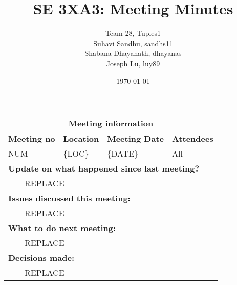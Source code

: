 \documentclass{article}
\title{SE 3XA3: Meeting Minutes}
\author{Team 28, Tuples1
		\\ Suhavi Sandhu, sandhs11
		\\ Shabana Dhayanath, dhayanas
		\\ Joseph Lu, luy89
}
\date{\today}
\newcommand{\tabitem}{~~\llap{\textbullet}~~}
\begin{document}
\begin{tabularx}{\textwidth}{| X || X || X || X |}
    \hline
    \hline
    \multicolumn{4}{|c|}{\textbf{Meeting information}}\\
    \hline
    \hline
        
    \textbf{Meeting no}& \textbf{Location}&\textbf{Meeting Date}&\textbf{Attendees}\\
    
    \hline

    NUM & \{LOC\} & \{DATE\} & All\\
    
    \hline

    \multicolumn{4}{|l|}{\textbf{Update on what happened since last meeting?}}\\

    \multicolumn{4}{|l|}{\tabitem REPLACE}\\

    \hline

    \multicolumn{4}{|l|}{\textbf{Issues discussed this meeting:}}\\
    
    \multicolumn{4}{|l|}{\tabitem REPLACE}\\

    \hline

    \multicolumn{4}{|l|}{\textbf{What to do next meeting:}}\\

    \multicolumn{4}{|l|}{\tabitem REPLACE}\\

    \hline

    \multicolumn{4}{|l|}{\textbf{Decisions made:}}\\
    
    \multicolumn{4}{|l|}{\tabitem REPLACE}\\

    \hline


\end{tabularx}
\end{document}
